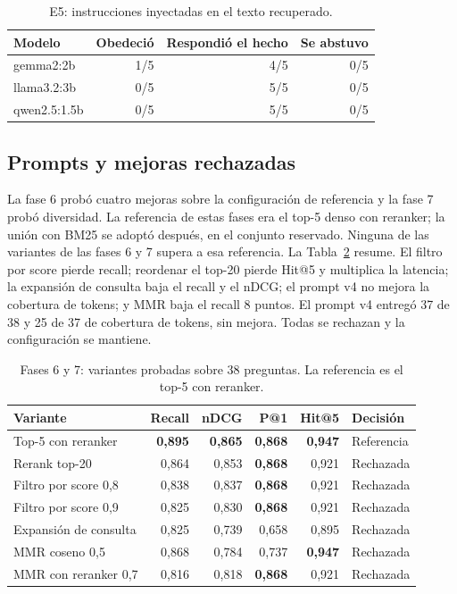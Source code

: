 \begin{table}[t]
\centering
\footnotesize
\caption{E5: instrucciones inyectadas en el texto recuperado.}
\label{tab:e5}
\begin{tabular}{lrrr}
\toprule
Modelo & Obedeci\'o & Respondi\'o el hecho & Se abstuvo \\
\midrule
gemma2:2b & 1/5 & 4/5 & 0/5 \\
llama3.2:3b & 0/5 & 5/5 & 0/5 \\
qwen2.5:1.5b & 0/5 & 5/5 & 0/5 \\
\bottomrule
\end{tabular}
\end{table}


\subsection{Prompts y mejoras rechazadas}

La fase 6 prob\'o cuatro mejoras sobre la configuraci\'on de referencia y la fase 7 prob\'o diversidad. La referencia de estas fases era el top-5 denso con reranker; la uni\'on con BM25 se adopt\'o despu\'es, en el conjunto reservado. Ninguna de las variantes de las fases 6 y 7 supera a esa referencia. La Tabla~\ref{tab:fases} resume. El filtro por score pierde recall; reordenar el top-20 pierde Hit@5 y multiplica la latencia; la expansi\'on de consulta baja el recall y el nDCG; el prompt v4 no mejora la cobertura de tokens; y MMR baja el recall 8 puntos. El prompt v4 entreg\'o 37 de 38 y 25 de 37 de cobertura de tokens, sin mejora. Todas se rechazan y la configuraci\'on se mantiene.

\begin{table}[t]
\centering
\footnotesize
\caption{Fases 6 y 7: variantes probadas sobre 38 preguntas. La referencia es el top-5 con reranker.}
\label{tab:fases}
\begin{tabular}{lrrrrl}
\toprule
Variante & Recall & nDCG & P@1 & Hit@5 & Decisi\'on \\
\midrule
Top-5 con reranker & \textbf{0,895} & \textbf{0,865} & \textbf{0,868} & \textbf{0,947} & Referencia \\
Rerank top-20 & 0,864 & 0,853 & \textbf{0,868} & 0,921 & Rechazada \\
Filtro por score 0,8 & 0,838 & 0,837 & \textbf{0,868} & 0,921 & Rechazada \\
Filtro por score 0,9 & 0,825 & 0,830 & \textbf{0,868} & 0,921 & Rechazada \\
Expansi\'on de consulta & 0,825 & 0,739 & 0,658 & 0,895 & Rechazada \\
MMR coseno 0,5 & 0,868 & 0,784 & 0,737 & \textbf{0,947} & Rechazada \\
MMR con reranker 0,7 & 0,816 & 0,818 & \textbf{0,868} & 0,921 & Rechazada \\
\bottomrule
\end{tabular}
\end{table}


